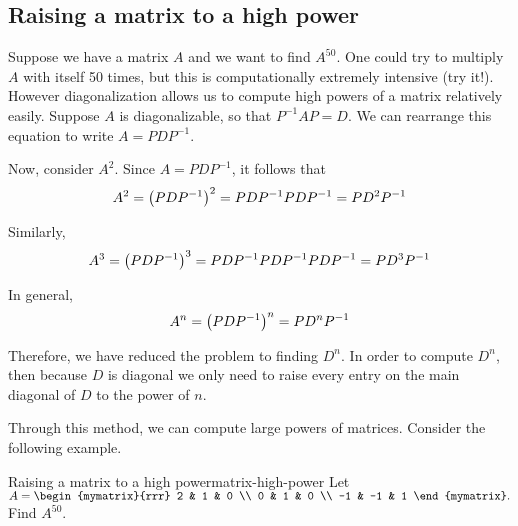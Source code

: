 \subsection{Raising a matrix to a high power}

Suppose we have a matrix $A$ and we want to find $A^{50}$. One could
try to multiply $A$ with itself 50 times, but this is computationally
extremely intensive (try it!). However diagonalization allows us to
compute high powers of a matrix relatively easily.  Suppose $A$ is
diagonalizable, so that $P^{-1}AP=D$. We can rearrange this equation
to write $A=PDP^{-1}$.

Now, consider $A^{2}$. Since $A=PDP^{-1}$, it follows that 
\begin{equation*}
A^{2} = \left(PDP^{-1}\right) ^{2}=PDP^{-1}PDP^{-1}=PD^{2}P^{-1}
\end{equation*}

Similarly, 
\begin{equation*}
A^3 = \left(PDP^{-1}\right) ^{3}=PDP^{-1}PDP^{-1}PDP^{-1}=PD^{3}P^{-1}
\end{equation*}

In general,
\begin{equation*}
A^n = \left(PDP^{-1}\right) ^{n}=PD^{n}P^{-1}
\end{equation*}

Therefore, we have reduced the problem to finding $D^{n}$. In order to
compute $D^{n}$, then because $D$ is diagonal we only need to raise
every entry on the main diagonal of $D$ to the power of $n$.

Through this method, we can compute large powers of matrices. Consider the following example.

\begin{example}{Raising a matrix to a high power}{matrix-high-power}
Let
  $A=\begin{mymatrix}{rrr}
2 & 1 & 0 \\
0 & 1 & 0 \\
-1 & -1 & 1
\end{mymatrix}. $ Find $A^{50}.$
\end{example}


